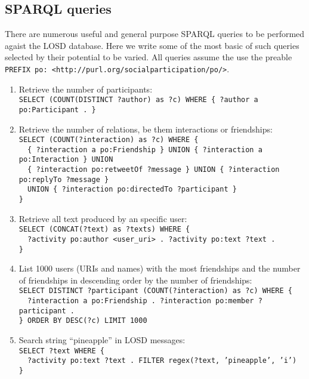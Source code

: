 \documentclass[review]{elsarticle}
\newcommand{\textttt}[1] {\texttt{\footnotesize#1}}
\newcommand{\h} {\hphantom ~ }
\begin{document}
\subsection{SPARQL queries}\label{queries}
There are numerous useful and general purpose SPARQL queries to be performed agaist the LOSD database.
Here we write some of the most basic of such queries selected by their potential to be varied.
All queries assume the use the preable \textttt{PREFIX po: <http://purl.org/socialparticipation/po/>}.
\begin{enumerate}[leftmargin=0cm]
	\item Retrieve the number of participants:\\
            \textttt{SELECT (COUNT(DISTINCT ?author) as ?c) WHERE \{
            ?author a po:Participant . \} }
	\item Retrieve the number of relations, be them interactions or
            friendships:\\
            \textttt{SELECT (COUNT(?interaction) as ?c) WHERE \{\\
                    \h \{ ?interaction a po:Friendship \} UNION \{ ?interaction
                    a po:Interaction \} UNION\\
                    \h \{ ?interaction po:retweetOf
                    ?message \} UNION \{ ?interaction po:replyTo ?message
                    \}\\
                    \h UNION \{ ?interaction po:directedTo ?participant
                    \}\\ \} }
	\item Retrieve all text produced by an specific user:\\
            \textttt{SELECT (CONCAT(?text) as ?texts) WHERE \{\\
                    \h ?activity po:author <user\_uri> . ?activity po:text ?text .\\
    \}}
        \item List 1000 users (URIs and names) with the most friendships and the number of
            friendships in descending order by the number of friendships:\\
            \textttt{SELECT DISTINCT ?participant (COUNT(?interaction)
            as ?c) WHERE \{\\
                \h ?interaction a po:Friendship . ?interaction po:member ?participant . \\
            \} ORDER BY DESC(?c) LIMIT 1000}
	\item Search string ``pineapple'' in LOSD messages:\\
            \textttt{SELECT ?text WHERE \{ \\
                    \h ?activity po:text ?text . FILTER regex(?text, 'pineapple', 'i')\\
    \}}
\end{enumerate}
\end{document}
